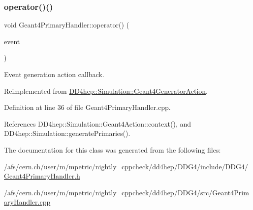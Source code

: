 \subsubsection{\texorpdfstring{operator()()}{operator()()}}
{\footnotesize\ttfamily void Geant4\+Primary\+Handler\+::operator() (\begin{DoxyParamCaption}\item[{G4\+Event $\ast$}]{event }\end{DoxyParamCaption})\hspace{0.3cm}{\ttfamily [virtual]}}



Event generation action callback. 



Reimplemented from \hyperlink{class_d_d4hep_1_1_simulation_1_1_geant4_generator_action_ac5a1d2335a19e3f9d555081199e01801}{D\+D4hep\+::\+Simulation\+::\+Geant4\+Generator\+Action}.



Definition at line 36 of file Geant4\+Primary\+Handler.\+cpp.



References D\+D4hep\+::\+Simulation\+::\+Geant4\+Action\+::context(), and D\+D4hep\+::\+Simulation\+::generate\+Primaries().



The documentation for this class was generated from the following files\+:\begin{DoxyCompactItemize}
\item 
/afs/cern.\+ch/user/m/mpetric/nightly\+\_\+cppcheck/dd4hep/\+D\+D\+G4/include/\+D\+D\+G4/\hyperlink{_geant4_primary_handler_8h}{Geant4\+Primary\+Handler.\+h}\item 
/afs/cern.\+ch/user/m/mpetric/nightly\+\_\+cppcheck/dd4hep/\+D\+D\+G4/src/\hyperlink{_geant4_primary_handler_8cpp}{Geant4\+Primary\+Handler.\+cpp}\end{DoxyCompactItemize}
